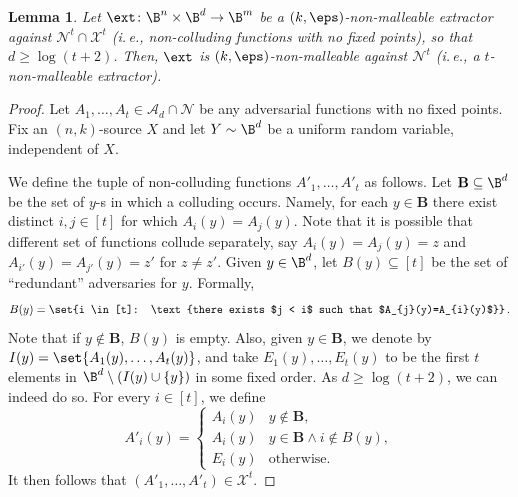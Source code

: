 \documentclass[11pt]{article}
\numberwithin{equation}{section}
\newtheorem{lemma}[theorem]{Lemma}
\theoremstyle{definition}
\theoremstyle{plain}
\newcommand{\ie}{i.\,e.}
\begin{document}
\begin{lemma}\label{lem:nm-with-coll} 
Let $\ext \colon \B^{n} \times \B^{d} \rightarrow \B^{m}$ be a $(k,\eps)$-non-malleable
extractor against $\mathcal{N}^{t} \cap \mathcal{X}^{t}$ (\ie, non-colluding functions
with no fixed points), so that $d \ge \log (t + 2)$. Then, $\ext$ is $(k,\eps)$-non-malleable
against $\mathcal{N}^{t}$ (\ie, a $t$-non-malleable extractor).
\end{lemma}
\begin{proof}
Let $A_1,\ldots,A_t \in \mathcal{A}_d \cap \mathcal{N}$ be any adversarial
functions with no fixed points. 
Fix an $(n,k)$-source $X$ and let $Y \sim \B^d$ be a uniform random variable,
independent of $X$.

We define the tuple of non-colluding functions
$A'_1,\ldots,A'_t$ as follows. Let $\mathbf{B} \subseteq \B^d$ be the set of $y$-s 
in which a colluding occurs. Namely, for each $y \in \mathbf{B}$ there exist distinct $i,j \in [t]$
for which $A_{i}(y)=A_{j}(y)$. Note that it is possible that different set of functions collude
separately, say $A_{i}(y)=A_{j}(y) = z$ and $A_{i'}(y)=A_{j'}(y) = z'$ for $z \neq z'$.
Given $y \in \B^d$, let $B(y) \subseteq [t]$ be the set of ``redundant'' 
adversaries for $y$. Formally, 
\[
B(y) = \set{i \in [t]: \text{there exists $j < i$ such that $A_{j}(y)=A_{i}(y)$}}\,.
\]
Note that if $y \notin \mathbf{B}$, $B(y)$ is empty. 
Also, given $y \in \mathbf{B}$, we denote by $I(y) = \set{A_{1}(y),\ldots,A_{t}(y)}$, and
take $E_1(y),\ldots,E_{t}(y)$ to be the first $t$ elements in $\B^{d} \setminus (I(y) \cup \{y\})$ in some fixed order.  
As $d \ge \log( t + 2)$, we can indeed do so. For every $i \in [t]$, we define
\[
A'_{i}(y) = 
\begin{cases}
A_{i}(y) & y \notin \mathbf{B}, \\
A_{i}(y) & y \in \mathbf{B} \wedge i \notin B(y), \\
E_{i}(y) & \text{otherwise}.
\end{cases}
\]
It then follows that $\left( A'_1,\ldots,A'_t \right) \in \mathcal{X}^t$. 


\end{proof}
\end{document}

